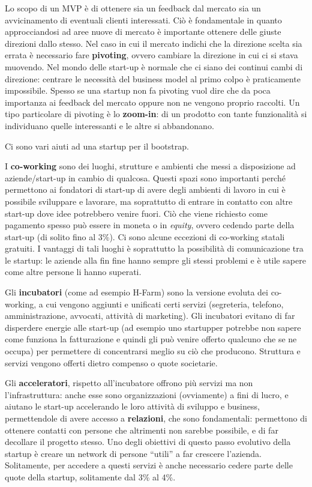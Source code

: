 \begin{enumerate}
 Lo scopo di un MVP è di ottenere sia un feedback dal mercato sia
 un avvicinamento di eventuali clienti interessati. Ciò è fondamentale in
 quanto approcciandosi ad aree nuove di mercato è importante ottenere delle
 giuste direzioni dallo stesso. Nel caso in cui il mercato indichi che la
 direzione scelta sia errata è necessario fare \textbf{pivoting},
 ovvero cambiare la direzione in cui ci si stava muovendo. Nel mondo delle
 start-up è normale che ci siano dei continui cambi di direzione: centrare le
 necessità del business model al primo colpo è praticamente impossibile. Spesso
 se una startup non fa pivoting vuol dire che da poca importanza ai feedback
 del mercato oppure non ne vengono proprio raccolti. Un tipo particolare di
 pivoting è lo \textbf{zoom-in}: di un prodotto con tante funzionalità si
 individuano quelle interessanti e le altre si abbandonano.

 Ci sono vari aiuti ad una startup per il bootstrap.

 I \textbf{co-working} sono dei luoghi, strutture e ambienti che messi a
 disposizione ad aziende/start-up in cambio di qualcosa.
 Questi spazi sono importanti perché permettono ai fondatori di start-up di
 avere degli ambienti di lavoro in cui è possibile sviluppare e lavorare, ma
 soprattutto di entrare in contatto con altre start-up dove idee potrebbero
 venire  fuori. Ciò che viene richiesto come pagamento spesso può essere in
 moneta o in  \textit{equity}, ovvero cedendo parte della start-up (di solito
 fino al 3\%). Ci sono alcune eccezioni di co-working statali gratuiti. I
 vantaggi di tali  luoghi è soprattutto la possibilità di comunicazione tra le
 startup: le aziende alla fin fine hanno sempre gli stessi problemi e è utile
 sapere come altre persone li hanno superati.

 Gli \textbf{incubatori} (come ad esempio H-Farm) sono la versione evoluta dei
 co-working, a cui vengono aggiunti e unificati certi servizi (segreteria,
 telefono, amministrazione, avvocati, attività di marketing). Gli incubatori
 evitano di far disperdere energie alle start-up (ad esempio uno startupper
 potrebbe non sapere come funziona la fatturazione e quindi gli può venire
 offerto qualcuno che se ne occupa) per permettere di concentrarsi meglio su
 ciò che producono. Struttura e servizi vengono offerti dietro compenso o quote
 societarie.

 Gli \textbf{acceleratori}, rispetto all'incubatore offrono più servizi ma non
 l'infrastruttura: anche esse sono organizzazioni (ovviamente) a fini di lucro,
 e aiutano le start-up accelerando le loro attività di sviluppo e business,
 permettendole di avere accesso a \textbf{relazioni}, che sono fondamentali:
 permettono di ottenere contatti con persone che altrimenti non sarebbe
 possibile, e di far decollare il progetto stesso. Uno degli obiettivi di
 questo passo evolutivo della startup è creare un network di persone ``utili''
 a far crescere l'azienda. Solitamente, per accedere a questi servizi è anche
 necessario cedere parte delle quote della startup, solitamente dal 3\% al 4\%.


\end{enumerate}
